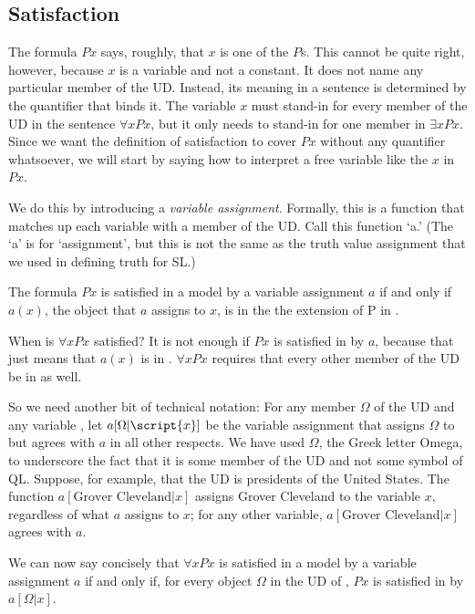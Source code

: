 \subsection{Satisfaction}

The formula $Px$ says, roughly, that $x$ is one of the $P$s. This cannot be quite right, however, because $x$ is a variable and not a constant. It does not name any particular member of the UD. Instead, its meaning in a sentence is determined by the quantifier that binds it. The variable $x$ must stand-in for every member of the UD in the sentence $\forall xPx$, but it only needs to stand-in for one member in $\exists xPx$. Since we want the definition of satisfaction to cover $Px$ without any quantifier whatsoever, we will start by saying how to interpret a free variable like the $x$ in $Px$.


We do this by introducing a \emph{variable assignment}. Formally, this is a function that matches up each variable with a member of the UD. Call this function `a.' (The `a' is for `assignment', but this is not the same as the truth value assignment that we used in defining truth for SL.)

The formula $Px$ is satisfied in a model  by a variable assignment $a$ if and only if $a(x)$, the object that $a$ assigns to $x$, is in the the extension of P in .

When is $\forall x Px$ satisfied? It is not enough if $Px$ is satisfied in  by $a$, because that just means that $a(x)$ is in . $\forall x Px$ requires that every other member of the UD be in  as well.

So we need another bit of technical notation: For any member $\Omega$ of the UD and any variable , let $a[\Omega|\script{x}]$ be the variable assignment that assigns $\Omega$ to  but agrees with $a$ in all other respects. We have used $\Omega$, the Greek letter Omega, to underscore the fact that it is some member of the UD and not some symbol of QL. Suppose, for example, that the UD is presidents of the United States. The function $a[\mbox{Grover Cleveland}|x]$ assigns Grover Cleveland to the variable $x$, regardless of what $a$ assigns to $x$; for any other variable, $a[\mbox{Grover Cleveland}|x]$ agrees with $a$.

We can now say concisely that $\forall x Px$ is satisfied in a model  by a variable assignment $a$ if and only if, for every object $\Omega$ in the UD of , $Px$ is satisfied in  by $a[\Omega|x]$.

